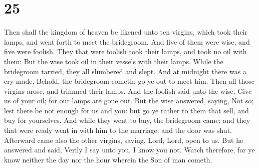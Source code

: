 \hypertarget{section-24}{%
\section{25}\label{section-24}}

 Then shall the kingdom of heaven be likened unto ten
virgins, which took their lamps, and went forth to meet the bridegroom.
 And five of them were wise, and five were foolish.
 They that were foolish took their lamps, and took no oil
with them:  But the wise took oil in their vessels with
their lamps.  While the bridegroom tarried, they all
slumbered and slept.  And at midnight there was a cry made,
Behold, the bridegroom cometh; go ye out to meet him.  Then
all those virgins arose, and trimmed their lamps.  And the
foolish said unto the wise, Give us of your oil; for our lamps are gone
out.  But the wise answered, saying, Not so; lest there be
not enough for us and you: but go ye rather to them that sell, and buy
for yourselves.  And while they went to buy, the bridegroom
came; and they that were ready went in with him to the marriage: and the
door was shut.  Afterward came also the other virgins,
saying, Lord, Lord, open to us.  But he answered and said,
Verily I say unto you, I know you not.  Watch therefore,
for ye know neither the day nor the hour wherein the Son of man cometh.

